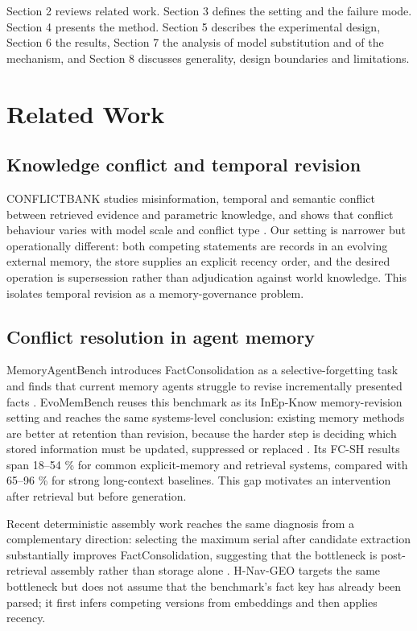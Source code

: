 \documentclass[journal=jcisd8,manuscript=article]{achemso}
\begin{document}
Section 2 reviews related work. Section 3 defines the setting and the failure mode. Section 4 presents the method. Section 5 describes the experimental design, Section 6 the results, Section 7 the analysis of model substitution and of the mechanism, and Section 8 discusses generality, design boundaries and limitations.

\section{Related Work}
\label{sec:related}

\subsection{Knowledge conflict and temporal revision}

CONFLICTBANK studies misinformation, temporal and semantic conflict between retrieved evidence and parametric knowledge, and shows that conflict behaviour varies with model scale and conflict type \cite{su2024conflictbank}. Our setting is narrower but operationally different: both competing statements are records in an evolving external memory, the store supplies an explicit recency order, and the desired operation is supersession rather than adjudication against world knowledge. This isolates temporal revision as a memory-governance problem.

\subsection{Conflict resolution in agent memory}

MemoryAgentBench introduces FactConsolidation as a selective-forgetting task and finds that current memory agents struggle to revise incrementally presented facts \cite{hu2026memoryagentbench}. EvoMemBench reuses this benchmark as its InEp-Know memory-revision setting and reaches the same systems-level conclusion: existing memory methods are better at retention than revision, because the harder step is deciding which stored information must be updated, suppressed or replaced \cite{wang2026evomembench}. Its FC-SH results span 18--54 \% for common explicit-memory and retrieval systems, compared with 65--96 \% for strong long-context baselines. This gap motivates an intervention after retrieval but before generation.

Recent deterministic assembly work reaches the same diagnosis from a complementary direction: selecting the maximum serial after candidate extraction substantially improves FactConsolidation, suggesting that the bottleneck is post-retrieval assembly rather than storage alone \cite{reddy2026freshness}. H-Nav-GEO targets the same bottleneck but does not assume that the benchmark's fact key has already been parsed; it first infers competing versions from embeddings and then applies recency.
\end{document}
